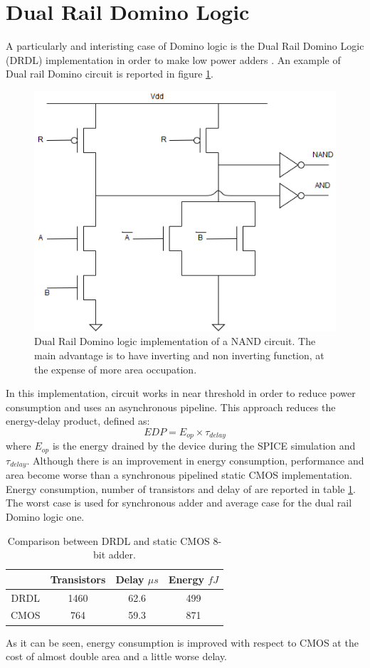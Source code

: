 \section{Dual Rail Domino Logic}
A particularly and interisting case of Domino logic is the Dual Rail Domino Logic (DRDL) implementation in order to make low power adders \cite{dominoAdder8}. An example of Dual rail Domino circuit is reported in figure \ref{fig:Dual Rail}.
\begin{figure}[H]
\centering
\includegraphics[width = 7 cm]{dinamic_logic_survey/Dynamic_logic-Page-3.png}
\caption{Dual Rail Domino logic implementation of a NAND circuit. The main advantage is to have inverting and non inverting function, at the expense of more area occupation.}
\label{fig:Dual Rail} 
\end{figure}
In this implementation, circuit works in near threshold in order to reduce power consumption and uses an asynchronous pipeline. This approach reduces the energy-delay product, defined as:
\begin{equation}
EDP = E_{op} \times \tau_{delay}
\end{equation}
where $E_{op}$ is the energy drained by the device during the SPICE simulation and $\tau_{delay}$. Although there is an improvement in energy consumption, performance and area become worse than a synchronous pipelined static CMOS implementation. Energy consumption, number of transistors and delay of \cite{dominoAdder8} are reported in table \ref{tab:8bitAdder}. The worst case is used for synchronous adder and average case for the dual rail Domino logic one.
\begin{table}[H]
\centering
\begin{tabular}{|c|c|c|c|}
\hline 
 & Transistors & Delay $\mu s$ & Energy $fJ$ \\ 
\hline 
DRDL & 1460 & 62.6 & 499 \\ 
\hline 
CMOS & 764 & 59.3 & 871 \\ 
\hline 
\end{tabular}
\caption{Comparison between DRDL and static CMOS 8-bit adder.}
\label{tab:8bitAdder}
\end{table}
As it can be seen, energy consumption is improved with respect to CMOS at the cost of almost double area and a little worse delay.


